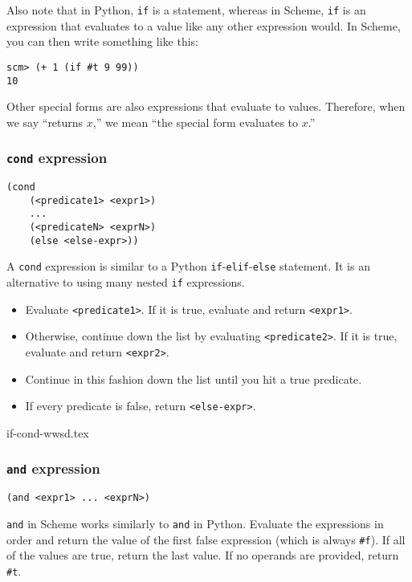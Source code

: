 Also note that in Python, \lstinline{if} is a statement, whereas in Scheme, \lstinline{if} is an expression that evaluates to a value like any other expression would. In Scheme, you can then write something like this:
\begin{lstlisting}
scm> (+ 1 (if #t 9 99))
10
\end{lstlisting}

Other special forms are also expressions that evaluate to values. 
Therefore, when we say ``returns $x$,'' we mean ``the special form evaluates to $x$.''

\subsubsection{\lstinline{cond} expression}

\begin{lstlisting}
(cond 
    (<predicate1> <expr1>) 
    ... 
    (<predicateN> <exprN>) 
    (else <else-expr>))
\end{lstlisting}

A \lstinline{cond} expression is similar to a Python \lstinline{if}-\lstinline{elif}-\lstinline{else} statement. It is an alternative to using many nested \lstinline{if} expressions. 

\begin{itemize}
    \item Evaluate \lstinline{<predicate1>}. If it is true, evaluate and return \lstinline{<expr1>}.
    \item Otherwise, continue down the list by evaluating \lstinline{<predicate2>}. If it is true, evaluate and return \lstinline{<expr2>}.
    \item Continue in this fashion down the list until you hit a true predicate.
    \item If every predicate is false, return \lstinline{<else-expr>}. 
\end{itemize}

{if-cond-wwsd.tex}

\subsubsection{\lstinline{and} expression}
\begin{lstlisting}
(and <expr1> ... <exprN>)
\end{lstlisting}
\lstinline{and} in Scheme works similarly to \lstinline{and} in Python. Evaluate the expressions in order and return the value of the first false expression (which is always \lstinline{#f}). If all of the values are true, return the last value. If no operands are provided, return \lstinline{#t}.

